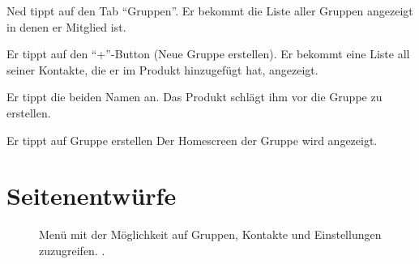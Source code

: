 \documentclass[parskip=full,11pt]{scrartcl}
\begin{document}

{Ned tippt auf den Tab  \enquote{Gruppen}.}
{Er bekommt die Liste aller Gruppen angezeigt in denen er Mitglied ist.}

{Er tippt auf den \enquote{+}-Button (Neue Gruppe erstellen).}
{Er bekommt eine Liste all seiner Kontakte, die er im Produkt hinzugefügt hat, angezeigt.}

{Er tippt die beiden Namen an.}
{Das Produkt schlägt ihm vor die Gruppe zu erstellen.}

{Er tippt auf Gruppe erstellen}
{Der Homescreen der Gruppe wird angezeigt.} %

\pagebreak
\appendix

\section{Seitenentwürfe}


\begin{figure}[hb]
	\caption{\label{fig:menu}
		Menü mit der Möglichkeit auf Gruppen, Kontakte und Einstellungen zuzugreifen.
		 .
	}
\end{figure}
\end{document}
